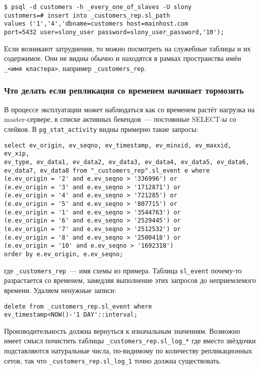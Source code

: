 \begin{lstlisting}[label=lst:slony18,caption=Устранение неисправностей]
$ psql -d customers -h _every_one_of_slaves -U slony
customers=# insert into _customers_rep.sl_path
values ('1','4','dbname=customers host=mainhost.com
port=5432 user=slony_user password=slony_user_password,'10');
\end{lstlisting}

Если возникают затруднения, то можно посмотреть на служебные таблицы и их содержимое. Они не видны обычно и находятся в рамках пространства имён \lstinline!_<имя кластера>!, например \lstinline!_customers_rep!.

\subsubsection{Что делать если репликация со временем начинает тормозить}

В процессе эксплуатации может наблюдаться как со временем растёт нагрузка на master-сервере, в списке активных бекендов~--- постоянные SELECT-ы со слейвов. В \lstinline!pg_stat_activity! видны примерно такие запросы:

\begin{lstlisting}[label=lst:slony19,caption=Устранение неисправностей]
select ev_origin, ev_seqno, ev_timestamp, ev_minxid, ev_maxxid, ev_xip,
ev_type, ev_data1, ev_data2, ev_data3, ev_data4, ev_data5, ev_data6,
ev_data7, ev_data8 from "_customers_rep".sl_event e where
(e.ev_origin = '2' and e.ev_seqno > '336996') or
(e.ev_origin = '3' and e.ev_seqno > '1712871') or
(e.ev_origin = '4' and e.ev_seqno > '721285') or
(e.ev_origin = '5' and e.ev_seqno > '807715') or
(e.ev_origin = '1' and e.ev_seqno > '3544763') or
(e.ev_origin = '6' and e.ev_seqno > '2529445') or
(e.ev_origin = '7' and e.ev_seqno > '2512532') or
(e.ev_origin = '8' and e.ev_seqno > '2500418') or
(e.ev_origin = '10' and e.ev_seqno > '1692318')
order by e.ev_origin, e.ev_seqno;
\end{lstlisting}

где \lstinline!_customers_rep!~--- имя схемы из примера. Таблица \lstinline!sl_event! почему-то разрастается со временем, замедляя выполнение этих запросов до неприемлемого времени. Удаляем ненужные записи:

\begin{lstlisting}[label=lst:slony20,caption=Устранение неисправностей]
delete from _customers_rep.sl_event where
ev_timestamp<NOW()-'1 DAY'::interval;
\end{lstlisting}

Производительность должна вернуться к изначальным значениям. Возможно имеет смысл почистить таблицы \lstinline!_customers_rep.sl_log_*! где вместо звёздочки подставляются натуральные числа, по-видимому по количеству репликационных сетов, так что \lstinline!_customers_rep.sl_log_1! точно должна существовать.

